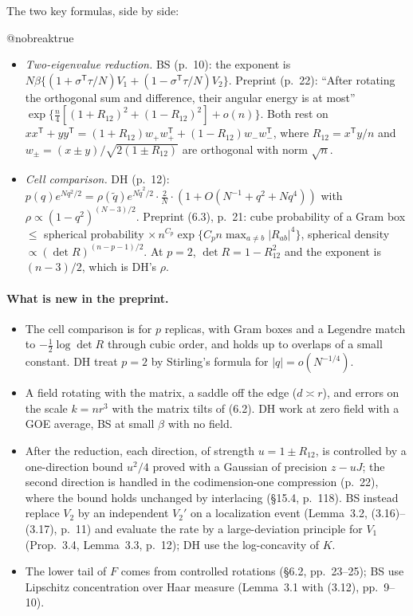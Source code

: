 \documentclass[11pt]{article}
\newcommand{\ploc}[2]{#1}
\begin{document}
The two key formulas, side by side:\par\nobreak\csname @nobreaktrue\endcsname
\begin{itemize}
\item \emph{Two-eigenvalue reduction.} BS (p.~10): the exponent is
 $N\beta\{(1+\sigma^{\mathsf T}\tau/N)V_1+(1-\sigma^{\mathsf T}\tau/N)V_2\}$.
 Preprint \ploc{(p.~22)}{profile-spectral.tex:793--799}: ``After rotating the
 orthogonal sum and difference, their angular energy is at most''
 $\exp\{\frac n4[(1+R_{12})^2+(1-R_{12})^2]+o(n)\}$. Both rest on
 $xx^{\mathsf T}+yy^{\mathsf T}=(1+R_{12})w_+w_+^{\mathsf T}+(1-R_{12})w_-w_-^{\mathsf T}$,
 where $R_{12}=x^{\mathsf T}y/n$ and $w_\pm=(x\pm y)/\sqrt{2(1\pm R_{12})}$
 are orthogonal with norm $\sqrt n$.
\item \emph{Cell comparison.} DH (p.~12):
 $p(q)e^{Nq^2/2}=\rho(\tilde q)e^{N\tilde q^2/2}\cdot\frac2N\cdot
 (1+O(N^{-1}+q^2+Nq^4))$ with $\rho\propto(1-q^2)^{(N-3)/2}$. Preprint
 \ploc{(6.3), p.~21}{profile-spectral.tex:712--719}: cube probability of a
 Gram box $\le$ spherical probability $\times\,n^{C_p}\exp\{C_pn\max_{a\ne
 b}|R_{ab}|^4\}$, spherical density $\propto(\det R)^{(n-p-1)/2}$. At $p=2$,
 $\det R=1-R_{12}^2$ and the exponent is $(n-3)/2$, which is DH's $\rho$.
\end{itemize}

\paragraph{What is new in the preprint.}
\begin{itemize}
\item The cell comparison is for $p$ replicas, with Gram boxes and a Legendre
 match to $-\frac12\log\det R$ through cubic order, and holds up to overlaps of
 a small constant. DH treat $p=2$ by Stirling's formula for
 $|q|=o(N^{-1/4})$.
\item A field rotating with the matrix, a saddle off the edge ($d\asymp r$),
 and errors on the scale $k=nr^3$ with the matrix tilts of (6.2). DH work at
 zero field with a GOE average, BS at small $\beta$ with no field.
\item After the reduction, each direction, of strength $u=1\pm R_{12}$, is
 controlled by a one-direction bound $u^2/4$ proved with a Gaussian of
 precision $z-uJ$; the second direction is handled in the codimension-one
 compression \ploc{(p.~22)}{profile-spectral.tex:800--816}, where the bound
 holds unchanged by interlacing \ploc{(\S15.4, p.~118)}{cap-static.tex:391--394}.
 BS instead replace $V_2$ by an independent $V_2'$ on a localization event
 (Lemma~3.2, (3.16)--(3.17), p.~11) and evaluate the rate by a
 large-deviation principle for $V_1$ (Prop.~3.4, Lemma~3.3, p.~12); DH use
 the log-concavity of $K$.
\item The lower tail of $F$ comes from controlled rotations
 \ploc{(\S6.2, pp.~23--25)}{profile-spectral.tex:880--1079}; BS use Lipschitz
 concentration over Haar measure (Lemma~3.1 with (3.12), pp.~9--10).
\end{itemize}
\end{document}
